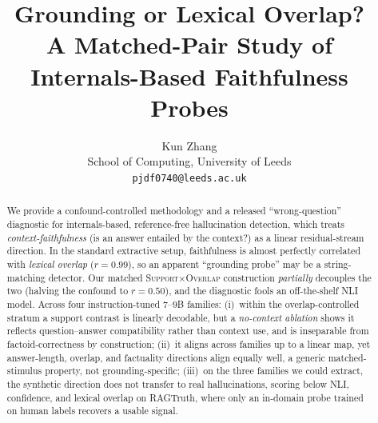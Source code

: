 \documentclass[11pt]{article}
\title{Grounding or Lexical Overlap?\\
A Matched-Pair Study of Internals-Based Faithfulness Probes}
\author{
  Kun Zhang \\
  School of Computing, University of Leeds \\
  \texttt{pjdf0740@leeds.ac.uk}
}
\begin{document}
\maketitle

\begin{abstract}
We provide a confound-controlled methodology and a released ``wrong-question''
diagnostic for internals-based, reference-free hallucination detection, which treats
\emph{context-faithfulness} (is an answer entailed by the context?) as a linear
residual-stream direction. In the standard extractive setup, faithfulness is almost
perfectly correlated with \emph{lexical overlap} ($r{=}0.99$), so an apparent
``grounding probe'' may be a string-matching detector. Our matched
\textsc{Support}$\times$\textsc{Overlap} construction \emph{partially} decouples the two
(halving the confound to $r{=}0.50$), and the diagnostic fools an off-the-shelf NLI
model. Across four instruction-tuned $7$--$9$B families: (i)~within the
overlap-controlled stratum a support contrast is linearly decodable, but a
\emph{no-context ablation} shows it reflects question--answer compatibility rather than
context use, and is inseparable from factoid-correctness by construction; (ii)~it aligns
across families up to a linear map, yet answer-length, overlap, and factuality
directions align equally well, a generic matched-stimulus property, not
grounding-specific; (iii)~on the three families we could extract, the synthetic direction does not transfer
to real hallucinations, scoring below NLI, confidence, and lexical overlap on RAGTruth,
where only an in-domain probe trained on human labels recovers a usable signal.
\end{abstract}





\appendix

\end{document}
